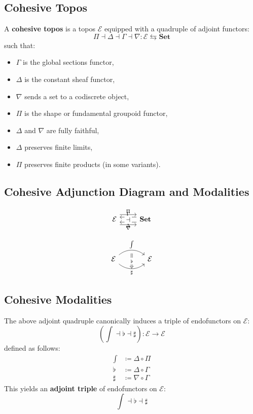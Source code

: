 \documentclass{article}
\begin{document}
\subsection{Cohesive Topos}
A \textbf{cohesive topos} is a topos $\mathcal{E}$ equipped with a quadruple of adjoint functors:
\[
\Pi \dashv \Delta \dashv \Gamma \dashv \nabla : \mathcal{E} \leftrightarrows \mathbf{Set}
\]
such that:
\begin{itemize}
  \item $\Gamma$ is the global sections functor,
  \item $\Delta$ is the constant sheaf functor,
  \item $\nabla$ sends a set to a codiscrete object,
  \item $\Pi$ is the shape or fundamental groupoid functor,
  \item $\Delta$ and $\nabla$ are fully faithful,
  \item $\Delta$ preserves finite limits,
  \item $\Pi$ preserves finite products (in some variants).
\end{itemize}

\subsection{Cohesive Adjunction Diagram and Modalities}

\[
\begin{tikzcd}
\mathcal{E}
  \arrow[r, shift left=3, "\Pi"]
  \arrow[r, shift right=3, "\nabla"']
  \arrow[r, phantom, "\dashv" description]
  & \mathbf{Set}
  \arrow[l, shift left=1.5, "\Delta"]
  \arrow[l, shift right=1.5, "\Gamma"']
  \arrow[l, phantom, "\dashv" description]
\end{tikzcd}
\]

\[
\begin{tikzcd}[column sep=large]
\mathcal{E}
  \arrow[r, bend left=40, "\int", ""{name=s, below}]
  \arrow[r, bend right=40, "\sharp"'{name=t}]
  & \mathcal{E}
  \arrow[Rightarrow, from=s, to=t, "\flat" description]
\end{tikzcd}
\]


\newpage
\subsection{Cohesive Modalities}

The above adjoint quadruple canonically induces a triple of endofunctors on $\mathcal{E}$:
\[
(\int \dashv \flat \dashv \sharp) : \mathcal{E} \to \mathcal{E}
\]
defined as follows:
\begin{align*}
\int &\coloneqq \Delta \circ \Pi \\
\flat &\coloneqq \Delta \circ \Gamma \\
\sharp &\coloneqq \nabla \circ \Gamma
\end{align*}
This yields an \textbf{adjoint triple} of endofunctors on $\mathcal{E}$:
\[
\int \dashv \flat \dashv \sharp
\]
\end{document}
